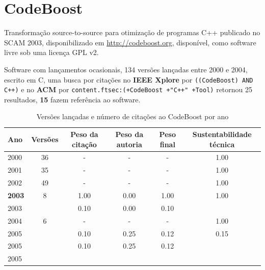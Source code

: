 \section{CodeBoost}

Transformação source-to-source para otimização de programas C++
publicado no SCAM 2003,
disponibilizado em \url{http://codeboost.org},
disponível,
como software livre
sob uma licença GPL v2.

Software com lançamentos ocasionais,
134 versões lançadas
entre 2000 e 2004,
escrito em C,
uma busca por citações no {\bf IEEE Xplore} por
\texttt{((CodeBoost) AND C++)}
e no {\bf ACM} por
\texttt{content.ftsec:(+CodeBoost +"C++" +Tool)}
retornou
25 resultados,
{\bf 15} fazem referência ao software.


\begin{table}[H]
\caption{Versões lançadas e número de citações ao CodeBoost por ano}
\centering
\begin{tabular}{| l | c | c | c | c | c |}
  \hline
  Ano & Versões & Peso da citação & Peso da autoria & Peso final & Sustentabilidade técnica \\
  \hline
        2000 & 36 & - & - & -
        &
          {\color{blue} 1.00}
        \\
\hline
        2001 & 35 & - & - & -
        &
          {\color{blue} 1.00}
        \\
\hline
        2002 & 49 & - & - & -
        &
          {\color{blue} 1.00}
        \\
\hline
            {\bf 2003}
          &
          8
          &
          1.00
          &
          0.00
          &
          1.00
          &
            {\color{blue} 1.00}
          \\
            2003
          &
          
          &
          0.10
          &
          0.00
          &
          0.10
          &
          \\
\hline
        2004 & 6 & - & - & -
        &
          {\color{blue} 1.00}
        \\
\hline
            2005
          &
          
          &
          0.10
          &
          0.25
          &
          0.12
          &
            {\color{red} 0.15}
          \\
            2005
          &
          
          &
          0.10
          &
          0.25
          &
          0.12
          &
          \\
            2005
          &
          

\end{tabular}
\end{table}
